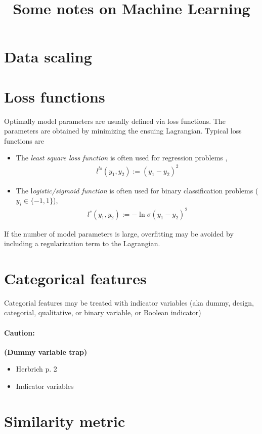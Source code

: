 \documentclass[10pt,a4paper]{article}
\title{Some notes on Machine Learning}
\begin{document}
\maketitle
\tableofcontents

\section{Data scaling}
\section{Loss functions}
Optimally model parameters are usually defined via loss functions. The parameters are obtained by minimizing the ensuing Lagrangian. Typical loss functions are
\begin{itemize}
\item The \textit{least square loss function} is often used for regression problems \cite{Rendle:2012:FML},
\begin{align}
 l^{ls}(y_1, y_2):=(y_1-y_2)^2
\end{align}
\item The l\textit{ogistic/sigmoid function} is often used for binary classification problems ($y_i \in \{-1,1 \}$),  
\begin{align}
l^{c}(y_1, y_2):=-\ln \sigma(y_1-y_2)^2
\end{align}
\end{itemize} 

If the number of model parameters is large, overfitting may be avoided by including a regularization term to the Lagrangian.
\section{Categorical features}
Categorial features may be treated with indicator variables  (aka dummy, design, categorial, qualitative, or binary variable, or Boolean indicator)
\paragraph*{Caution:} \textbf{(Dummy variable trap)}

\begin{itemize}
\item Herbrich p. 2 \cite{herbrich2015recommender}
\item Indicator variables
\end{itemize}
\section{Similarity metric}
\end{document}
